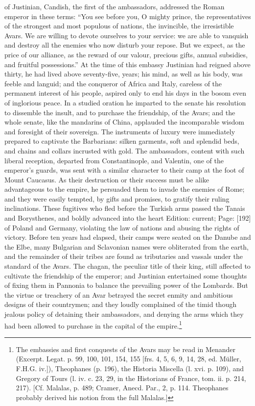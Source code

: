 of Justinian, Candish, the first of the ambassadors, addressed the Roman emperor in these terms: \texthebrew{“}You see before you, O mighty prince, the representatives of the strongest and most populous of nations, the invincible, the irresistible Avars. We are willing to devote ourselves to your service: we are able to vanquish and destroy all the enemies who now disturb your repose. But we expect, as the price of our alliance, as the reward of our valour, precious gifts, annual subsidies, and fruitful possessions.\texthebrew{}” At the time of this embassy Justinian had reigned above thirty, he had lived above seventy-five, years; his mind, as well as his body, was feeble and languid; and the conqueror of Africa and Italy, careless of the permanent interest of his people, aspired only to end his days in the bosom even of inglorious peace. In a studied oration he imparted to the senate his resolution to dissemble the insult, and to purchase the friendship, of the Avars; and the whole senate, like the mandarins of China, applauded the incomparable wisdom and foresight of their sovereign. The instruments of luxury were immediately prepared to captivate the Barbarians: silken garments, soft and splendid beds, and chains and collars incrusted with gold. The ambassadors, content with such liberal reception, departed from Constantinople, and Valentin, one of the emperor\texthebrew{}’s guards, was sent with a similar character to their camp at the foot of Mount Caucasus. As their destruction or their success must be alike advantageous to the empire, he persuaded them to invade the enemies of Rome; and they were easily tempted, by gifts and promises, to gratify their ruling inclinations. These fugitives who fled before the Turkish arms passed the Tanais and Borysthenes, and boldly advanced into the heart Edition: current; Page: [192] of Poland and Germany, violating the law of nations and abusing the rights of victory. Before ten years had elapsed, their camps were seated on the Danube and the Elbe, many Bulgarian and Sclavonian names were obliterated from the earth, and the remainder of their tribes are found as tributaries and vassals under the standard of the Avars. The chagan, the peculiar title of their king, still affected to cultivate the friendship of the emperor; and Justinian entertained some thoughts of fixing them in Pannonia to balance the prevailing power of the Lombards. But the virtue or treachery of an Avar betrayed the secret enmity and ambitious designs of their countrymen; and they loudly complained of the timid though jealous policy of detaining their ambassadors, and denying the arms which they had been allowed to purchase in the capital of the empire.\footnote{The embassies and first conquests of the Avars may be read in Menander (Excerpt. Legat. p. 99, 100, 101, 154, 155 [frs. 4, 5, 6, 9, 14, 28, ed. Müller, F.H.G. iv.]), Theophanes (p. 196), the Historia Miscella (l. xvi. p. 109), and Gregory of Tours (l. iv. c. 23, 29, in the Historians of France, tom. ii. p. 214, 217). [Cf. Malalas, p. 489; Cramer, Anecd. Par., 2, p. 114. Theophanes probably derived his notion from the full Malalas.]}


